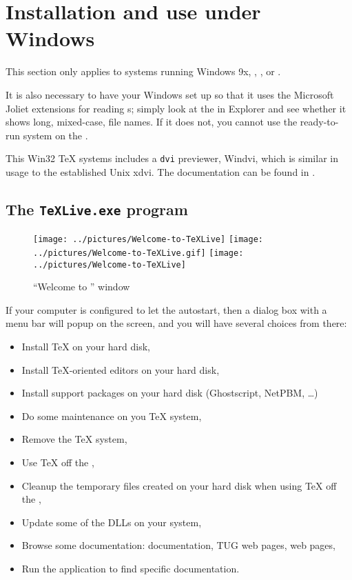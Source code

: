 \documentclass{article}
\begin{document}
\section{Installation and use under Windows}
\label{sec:wintex}
This section only applies to systems running Windows 9x, ,
,  or .

It is also necessary to have your Windows set up so that it uses the
Microsoft Joliet extensions for reading \CD s; simply look at the
\CD{} in Explorer and see whether it shows long, mixed-case, file
names. If it does not, you cannot use the ready-to-run system on the
\CD.

This Win32 \TeX{} systems includes a \texttt{dvi} previewer,
\textsf{Windvi}, which is similar in usage to the established Unix
\textsf{xdvi}. The documentation can be found in
.

\subsection[The TeXLive.exe program]{The \texttt{TeXLive.exe} program}

\begin{figure*}
 \begin{center}
  \ifnum {}
    \texttt{[image: ../pictures/Welcome-to-TeXLive]}
  \else
    \ifnum {}
\texttt{[image: ../pictures/Welcome-to-TeXLive.gif]}
    \else
        \texttt{[image: ../pictures/Welcome-to-TeXLive]}
    \fi
  \fi
 \end{center}
 \caption{``Welcome to \TeXLive'' window}\label{graph:welcome}
\end{figure*}

If your computer is configured to let the \CD{} autostart, then a
dialog box with a menu bar will popup on the screen, and you will have several choices
from there:
\begin{itemize}
\item Install \TeX{} on your hard disk,
\item Install TeX-oriented editors on your hard disk,
\item Install support packages on your hard disk (Ghostscript, NetPBM,
  \ldots)
\item Do some maintenance on you \TeX{} system,
\item Remove the \TeX{} system,
\item Use \TeX{} off the \CD{},
\item Cleanup the temporary files created on your hard disk when using
  \TeX{} off the \CD{},
\item Update some of the DLLs on your system,
\item Browse some documentation: \TeXLive{} documentation, TUG web
  pages, \fpTeX web pages,
\item Run the  application to find specific documentation.
\end{itemize}
\end{document}
